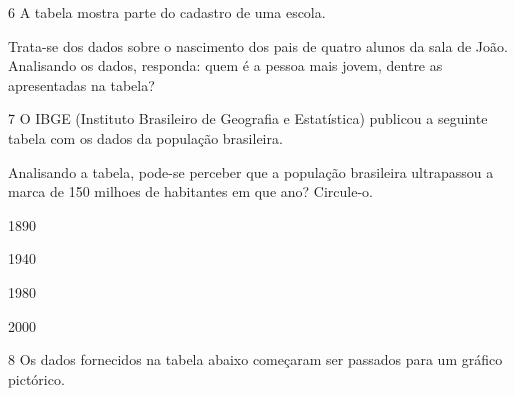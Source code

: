 {\begin{escolha}
\end{escolha}


\num{6} A tabela mostra parte do cadastro de uma escola.


Trata-se dos dados sobre o nascimento dos pais de quatro alunos da sala
de João. Analisando os dados, responda: quem é a pessoa mais jovem,
dentre as apresentadas na tabela?



\num{7} O IBGE (Instituto Brasileiro de Geografia e Estatística) publicou a
seguinte tabela com os dados da população brasileira.


Analisando a tabela, pode-se perceber que a população brasileira
ultrapassou a marca de 150 milhoes de habitantes em que ano? Circule-o.

\begin{escolha}
\item
  1890
\item
  1940
\item
  1980
\item
  2000
\end{escolha}


\num{8} Os dados fornecidos na tabela abaixo começaram ser passados para um
gráfico pictórico.

%

}
